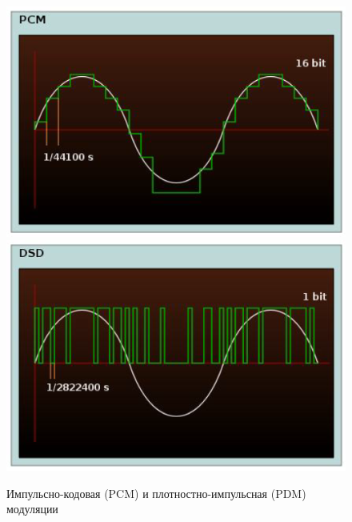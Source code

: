 	\begin{figure}[H]
		\centering
		\begin{minipage}[t]{0.48\linewidth}
			\centering
			\includegraphics[width=\linewidth, height=0.2\textheight]{img/03_01}
		\end{minipage}%
		\hfill
		\begin{minipage}[t]{0.48\linewidth}
			\centering
			\includegraphics[width=\linewidth, height=0.2\textheight]{img/03_02}
		\end{minipage}
		\small{Импульсно-кодовая (PCM) и плотностно-импульсная (PDM) модуляции}
		\label{fig:03_combined_1}
	\end{figure}
	
